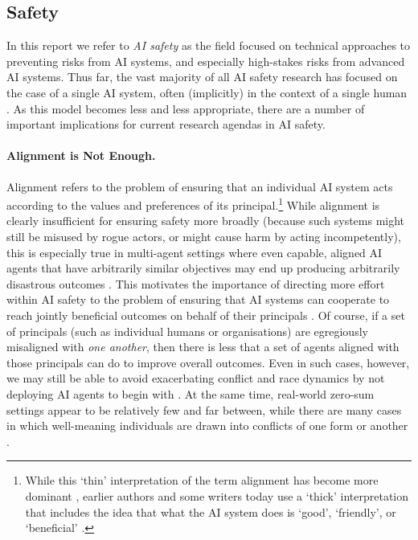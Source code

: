 \subsection{Safety}
\label{sec:safety}

In this report we refer to \textit{AI safety} as the field focused on technical approaches to preventing risks from AI systems, and especially high-stakes risks from advanced AI systems.
Thus far, the vast majority of all AI safety research has focused on the case of a single AI system, often (implicitly) in the context of a single human \citep[see, e.g.,][]{Armstrong2012,HadfieldMenell2016,Amodei2016,Leike2018,Christiano2018a,Hendrycks2021,Dalrymple2024}.
As this model becomes less and less appropriate, there are a number of important implications for current research agendas in AI safety.


\paragraph{Alignment is Not Enough.}
Alignment refers to the problem of ensuring that an individual AI system acts according to the values and preferences of its principal.\footnote{While this `thin' interpretation of the term alignment has become more dominant \citep{Hubinger2020a,Christiano2018c}, earlier authors and some writers today use a `thick' interpretation that includes the idea that what the AI system does is `good', `friendly', or `beneficial' \citep{Neslon2023,Yudkowsky2008,kirk2023the}.}
While alignment is clearly insufficient for ensuring safety more broadly (because such systems might still be misused by rogue actors, or might cause harm by acting incompetently), this is especially true in multi-agent settings where even capable, aligned AI agents that have arbitrarily similar objectives may end up producing arbitrarily disastrous outcomes \citep{Manheim2019,Critch2020,Jagadeesan2023a,Sourbut2024,Conitzer2023}.
This motivates the importance of directing more effort within AI safety to the problem of ensuring that AI systems can cooperate to reach jointly beneficial outcomes on behalf of their principals \citep{Dafoe2020}.
Of course, if a set of principals (such as individual humans or organisations) are egregiously misaligned with \textit{one another}, then there is less that a set of agents aligned with those principals can do to improve overall outcomes.
Even in such cases, however, we may still be able to avoid exacerbating conflict and race dynamics by not deploying AI agents to begin with \citep{Mitchell2025}.
At the same time, real-world zero-sum settings appear to be relatively few and far between, while there are many cases in which well-meaning individuals are drawn into conflicts of one form or another \citep[see also ]{Ostrom1990,fearon1995rationalist,gavrilets2015collective}.


